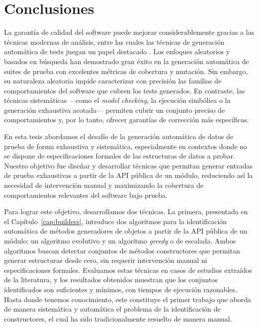\chapter{Conclusiones}
\label{cap:conclutions}

La garantía de calidad del software puede mejorar considerablemente gracias a las técnicas modernas de análisis, 
entre las cuales las técnicas de generación automática de tests juegan un papel destacado \cite{Cadar08, Luckow14, Fraser11, Pacheco07, Ma15, goGodefroid05, Marinov01, Boyapati02,Godefroid12}. 
Los enfoques aleatorios y basados en búsqueda han demostrado gran éxito en la generación automática de suites de prueba con excelentes métricas de cobertura y mutación. 
Sin embargo, su naturaleza aleatoria impide caracterizar con precisión las familias de comportamientos del software que cubren los tests generados. 
En contraste, las técnicas sistemáticas —como el \emph{model checking}, la ejecución simbólica o la generación exhaustiva acotada— permiten cubrir un conjunto preciso de comportamientos 
y, por lo tanto, ofrecer garantías de corrección más específicas.

En esta tesis abordamos el desafío de la generación automática de datos de prueba de forma exhaustiva y sistemática, 
especialmente en contextos donde no se dispone de especificaciones formales de las estructuras de datos a probar. 
Nuestro objetivo fue diseñar y desarrollar técnicas que permitan generar entradas de prueba exhaustivas a partir de la API pública de un módulo, 
reduciendo así la necesidad de intervención manual y maximizando la cobertura de comportamientos relevantes del software bajo prueba.

Para lograr este objetivo, desarrollamos dos técnicas. La primera, presentada en el Capítulo~\ref{cap:builders}, 
introduce dos algoritmos para la identificación automática de métodos generadores de objetos a partir de la API pública de un módulo: un algoritmo evolutivo y un algoritmo \emph{greedy} o de escalada.
Ambos algoritmos buscan detectar conjuntos de métodos constructores que permitan generar estructuras desde cero, 
sin requerir intervención manual ni especificaciones formales. 
Evaluamos estas técnicas en casos de estudios extraídos de la literatura, 
y los resultados obtenidos muestran que los conjuntos identificados son suficientes y mínimos, con tiempos de ejecución razonables. 
Hasta donde tenemos conocimiento, este constituye el primer trabajo que aborda de manera sistemática y automática el problema de la identificación de constructores, el cual ha sido tradicionalmente resuelto de manera manual.

